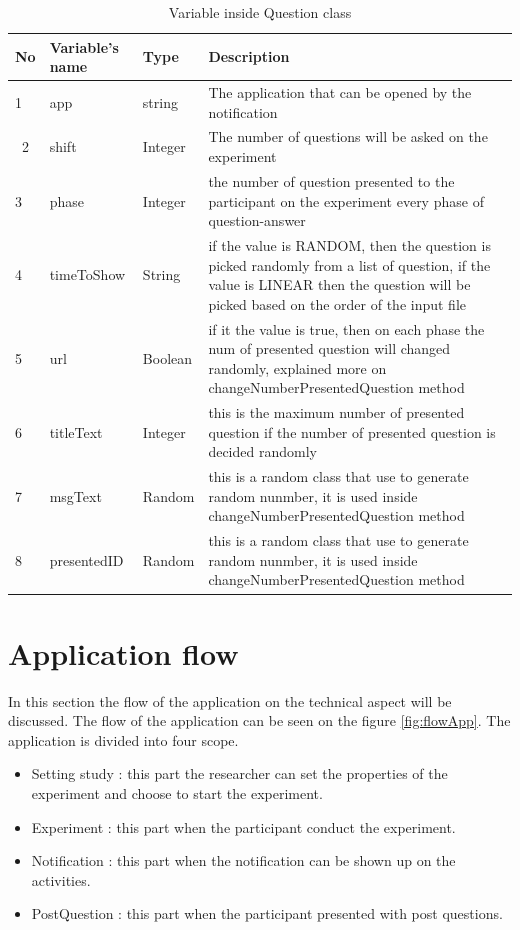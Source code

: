 

\begin{table}
  \centering
\begin{longtable}{ |p{0.5cm}|p{4cm}|p{2.3cm}|p{6cm}|  }
 \hline
 No& Variable's name & Type & Description \\
 \hline
 1 & app & string  & The application that can be opened by the notification \\\
 2 & shift & Integer & The number of questions will be asked on the experiment \\
 3 & phase & Integer & the number of question presented to the participant on the experiment every phase of question-answer \\
 4 & timeToShow & String & if the value is RANDOM, then the question is picked randomly from a list of question, if the value is LINEAR then the question will be picked based on the order of the input file \\
 5 & url & Boolean & if it the value is true, then on each phase the num of presented question will changed randomly, explained more on changeNumberPresentedQuestion method \\
 6 & titleText & Integer & this is the maximum number of presented question if the number of presented question is decided randomly\\
 7 & msgText & Random  & this is a random class that use to generate random nunmber, it is used inside changeNumberPresentedQuestion method \\
\hline
 8 & presentedID & Random  & this is a random class that use to generate random nunmber, it is used inside changeNumberPresentedQuestion method\\
\hline
\end{longtable}
\caption{Variable inside Question class}
 \label{tab:questionClassVariable}
\end{table}

\section{Application flow}
In this section the flow of the application on the technical aspect will be discussed.
The flow of the application can be seen
on the figure \ref{fig:flowApp}. The application is divided into four scope.
\begin{itemize}
\item Setting study : this part the researcher can set the properties of the experiment and choose to start the experiment.
\item Experiment : this part when the participant conduct the experiment.
\item Notification : this part when the notification can be shown up on the activities.
\item PostQuestion : this part when the participant presented with post questions.
\end{itemize}


